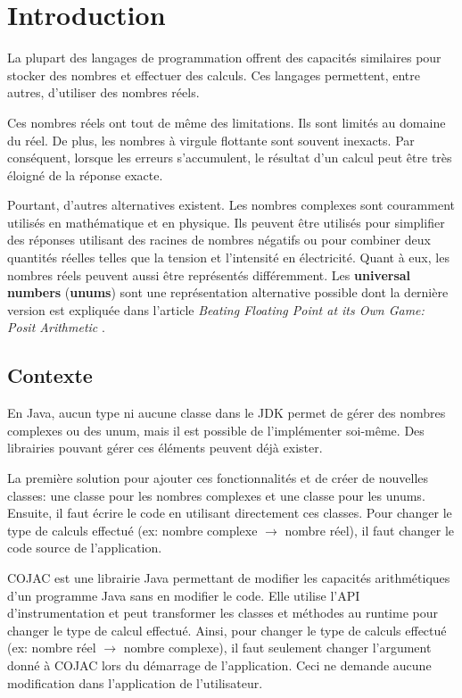 \chapter{Introduction}

La plupart des langages de programmation offrent des capacités similaires pour stocker des nombres et effectuer des calculs. Ces langages permettent, entre autres, d'utiliser  des nombres réels.

Ces nombres réels ont tout de même des limitations. Ils sont limités au domaine du réel. De plus, les nombres à virgule flottante sont souvent inexacts. Par conséquent, lorsque les erreurs s'accumulent, le résultat d'un calcul peut être très éloigné de la réponse exacte.

Pourtant, d'autres alternatives existent. Les nombres complexes sont couramment utilisés en mathématique et en physique. Ils peuvent être utilisés pour simplifier des réponses utilisant des racines de nombres négatifs ou pour combiner deux quantités réelles telles que la tension et l'intensité en électricité. Quant à eux, les nombres réels peuvent aussi être représentés différemment. Les \textbf{universal numbers} (\textbf{unums}) sont une représentation alternative possible dont la dernière version est expliquée dans l'article \textit{Beating Floating Point at its Own Game: Posit Arithmetic} \cite{posit}.


\section{Contexte}

En Java, aucun type ni aucune classe dans le JDK permet de gérer des nombres complexes ou des unum, mais il est possible de l'implémenter soi-même. Des librairies pouvant gérer ces éléments peuvent déjà exister.

La première solution pour ajouter ces fonctionnalités et de créer de nouvelles classes: une classe pour les nombres complexes et une classe pour les unums. Ensuite, il faut écrire le code en utilisant directement ces classes. Pour changer le type de calculs effectué (ex: nombre complexe $\rightarrow$ nombre réel), il faut changer le code source de l'application.

COJAC \cite{COJAC} est une librairie Java permettant de modifier les capacités arithmétiques d'un programme Java sans en modifier le code. Elle utilise l'API d'instrumentation et peut transformer les classes et méthodes au runtime pour changer le type de calcul effectué. Ainsi, pour changer le type de calculs effectué (ex: nombre réel $\rightarrow$ nombre complexe), il faut seulement changer l'argument donné à COJAC \cite{COJAC} lors du démarrage de l'application. Ceci ne demande aucune modification dans l'application de l'utilisateur.

